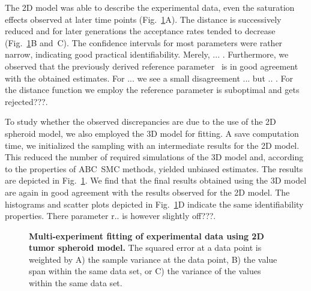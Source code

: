 \documentclass[10pt,letterpaper]{article}
\newcommand{\jh}[1]{{\color{red}#1}}
\begin{document}
The 2D model was able to describe the experimental data, even the saturation effects observed at later time points (Fig.~\ref{fig: multi-experiment fitting using 2D model}A). The distance is successively reduced and for later generations the acceptance rates tended to decrease (Fig.~\ref{fig: multi-experiment fitting using 2D model}B and~C). The confidence intervals for most parameters were rather narrow, indicating good practical identifiability. \jh{Merely, ... .} Furthermore, we observed that the previously derived reference parameter~\cite{JagiellaMul2015} is in good agreement with the obtained estimates. \jh{For ... we see a small disagreement ... but .. . For the distance function we employ the reference parameter is suboptimal and gets rejected???.}

\jh{
To study whether the observed discrepancies are due to the use of the 2D spheroid model, we also employed the 3D model for fitting. A save computation time, we initialized the sampling with an intermediate results for the 2D model. This reduced the number of required simulations of the 3D model and, according to the properties of ABC~SMC methods, yielded unbiased estimates. The results are depicted in Fig.~\ref{fig: multi-experiment fitting using 2D model}. We find that the final results obtained using the 3D model are again in good agreement with the results observed for the 2D model. The histograms and scatter plots depicted in Fig.~\ref{fig: multi-experiment fitting using 2D model}D indicate the same identifiability properties. \jh{There parameter r.. is however slightly off???.}
}

\begin{figure}[p]
\begin{adjustwidth}{-2in}{0in} %
\vspace*{0.5cm}
\caption{{\bf Multi-experiment fitting of experimental data using 2D tumor spheroid model.}
The squared error at a data point is weighted by A) the sample variance at the data point, B) the value span within the same data set, or C) the variance of the values within the same data set. 
}
\label{fig: multi-experiment fitting using 2D model}
\end{adjustwidth}
\end{figure}
\end{document}
